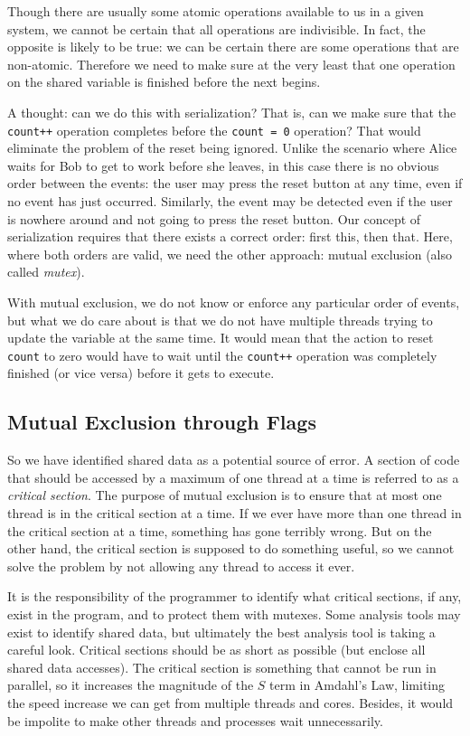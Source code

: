 \documentclass[a4paper]{report}
\begin{document}
Though there are usually some atomic operations available to us in a given system, we cannot be certain that all operations are indivisible. In fact, the opposite is likely to be true: we can be certain there are some operations that are non-atomic. Therefore we need to make sure at the very least that one operation on the shared variable is finished before the next begins.

A thought: can we do this with serialization? That is, can we make sure that the \texttt{count++} operation completes before the \texttt{count = 0} operation? That would eliminate the problem of the reset being ignored. Unlike the scenario where Alice waits for Bob to get to work before she leaves, in this case there is no obvious order between the events: the user may press the reset button at any time, even if no event has just occurred. Similarly, the event may be detected even if the user is nowhere around and not going to press the reset button. Our concept of serialization requires that there exists a correct order: first this, then that. Here, where both orders are valid, we need the other approach: mutual exclusion (also called \textit{mutex}).

With mutual exclusion, we do not know or enforce any particular order of events, but what we do care about is that we do not have multiple threads trying to update the variable at the same time. It would mean that the action to reset \texttt{count} to zero would have to wait until the \texttt{count++} operation was completely finished (or vice versa) before it gets to execute.

\subsection*{Mutual Exclusion through Flags}
So we have identified shared data as a potential source of error. A section of code that should be accessed by a maximum of one thread at a time is referred to as a \textit{critical section}. The purpose of mutual exclusion is to ensure that at most one thread is in the critical section at a time. If we ever have more than one thread in the critical section at a time, something has gone terribly wrong. But on the other hand, the critical section is supposed to do something useful, so we cannot solve the problem by not allowing any thread to access it ever.

It is the responsibility of the programmer to identify what critical sections, if any, exist in the program, and to protect them with mutexes. Some analysis tools may exist to identify shared data, but ultimately the best analysis tool is taking a careful look. Critical sections should be as short as possible (but enclose all shared data accesses). The critical section is something that cannot be run in parallel, so it increases the magnitude of the $S$ term in Amdahl's Law, limiting the speed increase we can get from multiple threads and cores. Besides, it would be impolite to make other threads and processes wait unnecessarily.
\end{document}
